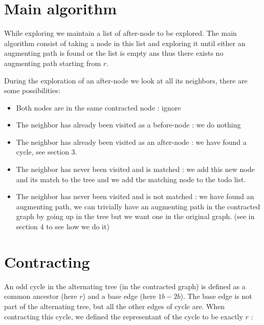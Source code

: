 \documentclass[a4paper,12pt]{article}
\renewcommand{\(}{\left(}
\renewcommand{\)}{\right)}
\begin{document}
\section{Main algorithm}

While exploring we maintain a list of after-node to be explored. The main
algorithm consist of taking a node in this list and exploring it until either an
augmenting path is found or the list is empty ans thus there exists no
augmenting path starting from $r$.


During the exploration of an after-node we look at all its neighbors, there are
some possibilities:
\begin{itemize}
\item Both nodes are in the same contracted node : ignore
\item The neighbor has already been visited as a before-node : we do nothing
\item The neighbor has already been visited as an after-node : we have found a
  cycle, see section 3.
\item The neighbor has never been visited and is matched : we add this new node
  and its match to the tree and we add the matching node to the todo list.
\item The neighbor has never been visited and is not matched : we have found an
  augmenting path, we can trivially have an augmenting path in the contracted
  graph by going up in the tree but we want one in the original graph. (see in
  section 4 to see how we do it)
\end{itemize}



\section{Contracting}

An odd cycle in the alternating tree (in the contracted graph) is defined as a
common ancestor (here $r$) and a base edge (here $1b - 2b$). The base edge is
not part of the alternating tree, but all the other edges of cycle are.
When contracting this cycle, we defined the representant of the cycle to be
exactly $r$ :
\begin{center}
\end{center}
\end{document}
